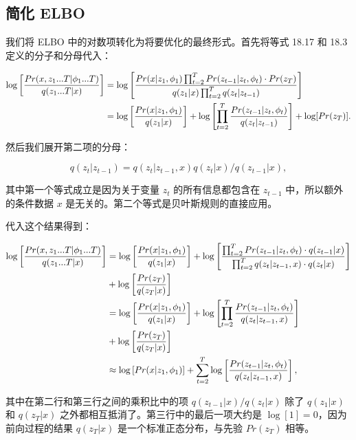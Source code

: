 \documentclass[lang=cn,newtx,10pt,scheme=chinese]{elegantbook}
\begin{document}
\subsection{简化 ELBO}
我们将 ELBO 中的对数项转化为将要优化的最终形式。首先将等式 18.17 和 18.3 定义的分子和分母代入：


\begin{align}
\log \left[ \frac{Pr(x, z_1...T|\phi_1...T)}{q(z_1...T|x)} \right] &= \log \left[ \frac{Pr(x|z_1, \phi_1) \prod_{t=2}^{T} Pr(z_{t-1}|z_t, \phi_t) \cdot Pr(z_T)}{q(z_1|x) \prod_{t=2}^{T} q(z_t|z_{t-1})} \right] \notag \\
&= \log \left[ \frac{Pr(x|z_1, \phi_1)}{q(z_1|x)} \right] + \log \left[ \prod_{t=2}^{T} \frac{Pr(z_{t-1}|z_t, \phi_t)}{q(z_t|z_{t-1})} \right] + \log [ Pr(z_T) ]. 
\end{align} 


然后我们展开第二项的分母：

\begin{equation}
q(z_t|z_{t-1}) = q(z_t|z_{t-1}, x)q(z_t|x) / q(z_{t-1}|x), 
\end{equation}

其中第一个等式成立是因为关于变量 \(z_t\) 的所有信息都包含在 \(z_{t-1}\) 中，所以额外的条件数据 \(x\) 是无关的。第二个等式是贝叶斯规则的直接应用。

代入这个结果得到：

\begin{align}
\log \left[ \frac{Pr(x, z_1...T|\phi_1...T)}{q(z_1...T|x)} \right] &= \log \left[ \frac{Pr(x|z_1, \phi_1)}{q(z_1|x)} \right] + \log \left[ \frac{\prod_{t=2}^{T} Pr(z_{t-1}|z_t, \phi_t) \cdot q(z_{t-1}|x)}{\prod_{t=2}^{T} q(z_t|z_{t-1}, x) \cdot q(z_t|x)} \right] \notag \\
&+ \log \left[ \frac{Pr(z_T)}{q(z_T|x)} \right]  \notag \\
&= \log \left[ \frac{Pr(x|z_1, \phi_1)}{q(z_1|x)} \right] + \log \left[ \prod_{t=2}^{T} \frac{Pr(z_{t-1}|z_t, \phi_t)}{q(z_t|z_{t-1}, x)} \right] \notag \\ 
&+ \log \left[ \frac{Pr(z_T)}{q(z_T|x)} \right]  \notag \\
&\approx \log \left[ Pr(x|z_1, \phi_1) \right] + \sum_{t=2}^{T} \log \left[ \frac{Pr(z_{t-1}|z_t, \phi_t)}{q(z_t|z_{t-1}, x)} \right], 
\end{align} 


其中在第二行和第三行之间的乘积比中的项 \(q(z_{t-1}|x)/q(z_t|x)\) 除了 \(q(z_1|x)\) 和 \(q(z_T|x)\) 之外都相互抵消了。第三行中的最后一项大约是 \(\log[1] = 0\)，因为前向过程的结果 \(q(z_T|x)\) 是一个标准正态分布，与先验 \(Pr(z_T)\) 相等。
\end{document}
